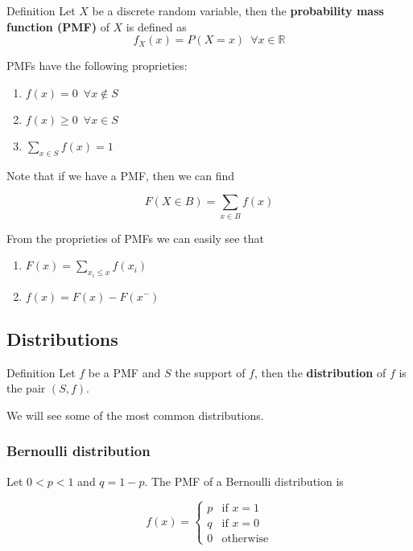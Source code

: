 \documentclass[10pt]{extarticle}
\newcommand{\R}{\mathbb{R}}
\begin{document}
\begin{bluebox}{Definition}
    Let $X$ be a discrete random variable, then the \textbf{probability mass function (PMF)} of $X$ is defined as
    $$
        f_X(x) = P(X = x) \enspace \forall x \in \R
    $$
\end{bluebox}

PMFs have the following proprieties:
\begin{enumerate}
    \item $f(x) = 0 \enspace \forall x \notin S$
    \item $f(x) \ge 0 \enspace \forall x \in S$
    \item $\sum_{x \in S} f(x) = 1$
\end{enumerate}

Note that if we have a PMF, then we can find

$$
    F(X \in B) = \sum_{x \in B} f(x)
$$

From the proprieties of PMFs we can easily see that

\begin{enumerate}
    \item $F(x) = \sum_{x_i \leq x} f(x_i)$
    \item $f(x) = F(x) - F(x^-)$
\end{enumerate}

\subsection{Distributions}

\begin{bluebox}{Definition}
    Let $f$ be a PMF and $S$ the support of $f$, then the \textbf{distribution} of $f$ is the pair $(S, f)$.
\end{bluebox}

We will see some of the most common distributions.

\subsubsection{Bernoulli distribution}

Let $0 < p < 1$ and $q = 1 - p$.
The PMF of a Bernoulli distribution is

$$
    f(x) =
    \begin{cases}
        p & \text{if } x = 1 \\
        q & \text{if } x = 0 \\
        0 & \text{otherwise}
    \end{cases}
$$
\end{document}
